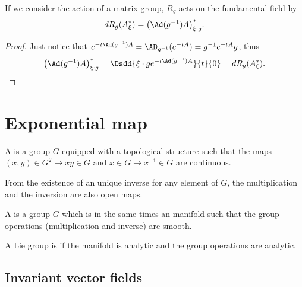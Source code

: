 \begin{lemma}
If we consider the action of a matrix group, $R_g$ acts on the fundamental field by
\[
  dR_g(A^*_{\xi})=\big( \Ad(g^{-1})A \big)^*_{\xi\cdot g}.
\]
\label{lem:dRgAstar}
\end{lemma}

\begin{proof}
Just notice that $e^{-t\Ad(g^{-1})A}=\AD_{g^{-1}}(e^{-tA})=g^{-1} e^{-tA}g$, thus
\begin{equation}
  \big( \Ad(g^{-1})A \big)^*_{\xi\cdot g}=\Dsdd{ \xi\cdot ge^{-t\Ad(g^{-1})A} }{t}{0}=dR_g(A^*_{\xi}).
\end{equation}
\end{proof}

\section{Exponential map}

\begin{definition}
    A  is a group $G$ equipped with a topological structure such that the maps $(x,y)\in G^2\to xy\in G$ and $x\in G\to x^{-1}\in G$ are continuous.
\end{definition}

\begin{remark}\label{rem:ouvert}
From the existence of an unique inverse for any element of $G$, the multiplication and the inversion are also open maps.
\end{remark}

\begin{definition}
    A  is a group $G$ which is in the same times an manifold such that the group operations (multiplication and inverse) are smooth.

    A Lie group is  if the manifold is analytic and the group operations are analytic.
\end{definition}

\subsection{Invariant vector fields}

